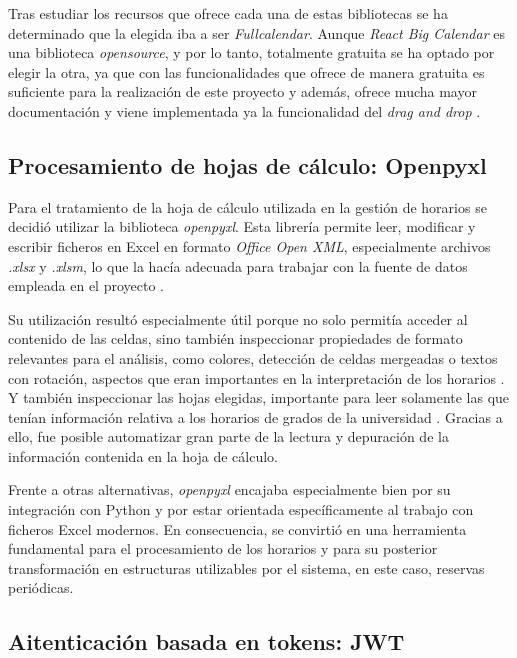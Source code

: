 Tras estudiar los recursos que ofrece cada una de estas bibliotecas se ha determinado que la elegida iba a ser \textit{Fullcalendar}. Aunque \textit{React Big Calendar} es una biblioteca \textit{opensource}, y por lo tanto, totalmente gratuita se ha optado por elegir la otra, ya que con las funcionalidades que ofrece de manera gratuita es suficiente para la realización de este proyecto y además, ofrece mucha mayor documentación y viene implementada ya la funcionalidad del \textit{drag and drop} \cite{fullcalendar:reactcalendar}. 

\subsection{Procesamiento de hojas de cálculo: Openpyxl}

Para el tratamiento de la hoja de cálculo utilizada en la gestión de horarios se decidió utilizar la biblioteca \textit{openpyxl}. Esta librería permite leer, modificar y escribir ficheros en Excel en formato \textit{Office Open XML}, especialmente archivos \textit{.xlsx} y \textit{.xlsm}, lo que la hacía adecuada para trabajar con la fuente de datos empleada en el proyecto \cite{openpyxl_docs}.

Su utilización resultó especialmente útil porque no solo permitía acceder al contenido de las celdas, sino también inspeccionar propiedades de formato relevantes para el análisis, como colores, detección de celdas mergeadas o textos con rotación, aspectos que eran importantes en la interpretación de los horarios \cite{openpyxl_styles}. Y también inspeccionar las hojas elegidas, importante para leer solamente las que tenían información relativa a los horarios de grados de la universidad \cite{openpyxl_defined_names}. Gracias a ello, fue posible automatizar gran parte de la lectura y depuración de la información contenida en la hoja de cálculo.

Frente a otras alternativas, \textit{openpyxl} encajaba especialmente bien por su integración con Python y por estar orientada específicamente al trabajo con ficheros Excel modernos. En consecuencia, se convirtió en una herramienta fundamental para el procesamiento de los horarios y para su posterior transformación en estructuras utilizables por el sistema, en este caso, reservas periódicas.

\subsection{Aitenticación basada en tokens: JWT}

